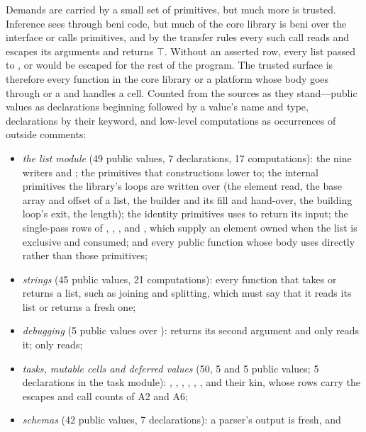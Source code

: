 Demands are carried by a small set of primitives, but much more is trusted. Inference sees through beni
code, but much of the core library is beni over the  interface or calls 
primitives, and by the transfer rules every such call reads and escapes its arguments and returns
$\top$. Without an asserted row, every list passed to ,  or
 would be escaped for the rest of the program. The trusted surface is therefore every
function in the core library or a platform whose body goes through  or a  and
handles a cell. Counted from the sources as they stand---public values as declarations beginning
 followed by a value's name and type,  declarations by their keyword, and
low-level computations as occurrences of  outside comments:
\begin{itemize}
\item \emph{the list module} (49 public values, 7  declarations, 17 
computations): the nine writers and ; the primitives that constructions lower to; the
internal primitives the library's loops are written over (the element read, the base array and offset of
a list, the builder and its fill and hand-over, the building loop's exit, the length); the identity
primitives  uses to return its input; the single-pass rows of , ,
,  and , which supply an element owned when the list is exclusive and
consumed; and every public function whose body uses  directly rather than those primitives;
\item \emph{strings} (45 public values, 21  computations): every function that takes or
returns a list, such as joining and splitting, which must say that it reads its list or returns a fresh
one;
\item \emph{debugging} (5 public values over ):  returns its second argument
and only reads it;  only reads;
\item \emph{tasks, mutable cells and deferred values} (50, 5 and 5 public values; 5 
declarations in the task module): , , , , ,
,  and their kin, whose rows carry the escapes and call counts of A2 and A6;
\item \emph{schemas} (42 public values, 7  declarations): a parser's output is fresh, and

\end{itemize}
